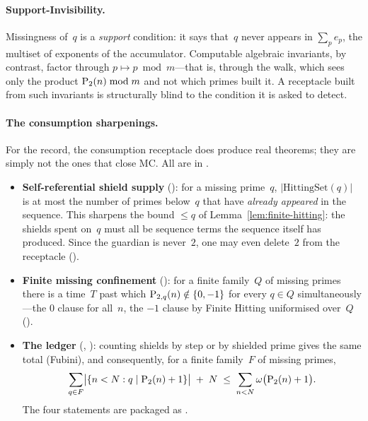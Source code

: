 \paragraph{Support-Invisibility.}
Missingness of~$q$ is a \emph{support} condition: it says that~$q$
never appears in $\sum_p e_p$, the multiset of exponents of the
accumulator.  Computable algebraic invariants, by contrast, factor
through $p \mapsto p \bmod m$---that is, through the walk, which sees
only the product $\mathrm{P}_{2}(n) \bmod m$ and not which primes built it.
A receptacle built from such invariants is structurally blind to the
condition it is asked to detect.

\paragraph{The consumption sharpenings.}
For the record, the consumption receptacle does produce real theorems;
they are simply not the ones that close MC\@.  All are in
.

\begin{itemize}[leftmargin=*]
\item \textbf{Self-referential shield supply}
  ():
  for a missing prime~$q$, $|\mathrm{HittingSet}(q)|$ is at most the
  number of primes below~$q$ that have \emph{already appeared} in the
  sequence.  This sharpens the bound $\leq q$ of
  Lemma~\ref{lem:finite-hitting}: the shields spent on~$q$ must all be
  sequence terms the sequence itself has produced.  Since the guardian
  is never~$2$, one may even delete~$2$ from the receptacle
  ().

\item \textbf{Finite missing confinement}
  ():
  for a finite family~$Q$ of missing primes there is a time~$T$ past
  which $\mathrm{P}_{2,q}(n) \notin \{0, -1\}$ for every $q \in Q$
  simultaneously---the $0$ clause for all~$n$, the $-1$ clause by
  Finite Hitting uniformised over~$Q$
  ().

\item \textbf{The ledger}
  (,
  ):
  counting shields by step or by shielded prime gives the same total
  (Fubini), and consequently, for a finite family~$F$ of missing
  primes,
  \[
    \sum_{q \in F}
      \bigl|\{n < N : q \mid \mathrm{P}_{2}(n)+1\}\bigr| \;+\; N
    \;\leq\; \sum_{n < N} \omega\bigl(\mathrm{P}_{2}(n)+1\bigr).
  \]
  The four statements are packaged as
  .
\end{itemize}

